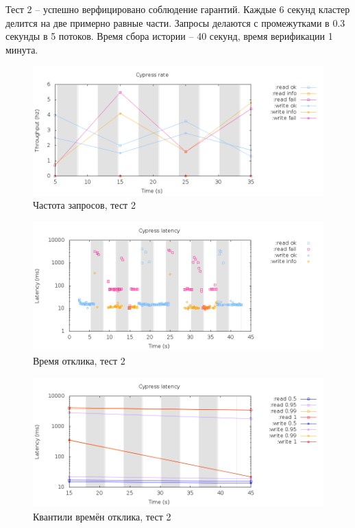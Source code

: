\documentclass[pdftex,ptm,14pt,a4paper]{extreport}
\theoremstyle{definition}
\begin{document}
Тест 2 -- успешно верфицировано соблюдение гарантий. Каждые 6
секунд кластер делится на две примерно равные части.
Запросы делаются с промежутками в 0.3 секунды в 5 потоков.
Время сбора истории -- 40 секунд, время верификации 1 минута.

\begin{figure}[H]
    \includegraphics[scale=0.6]{cypress-5/rate.png}
    \caption{Частота запросов, тест 2}
\end{figure}

\begin{figure}[H]
    \includegraphics[scale=0.6]{cypress-5/latency-raw.png}
    \caption{Время отклика, тест 2}
\end{figure}

\begin{figure}[H]
    \includegraphics[scale=0.6]{cypress-5/latency-quantiles.png}
    \caption{Квантили времён отклика, тест 2}
\end{figure}
\end{document}
